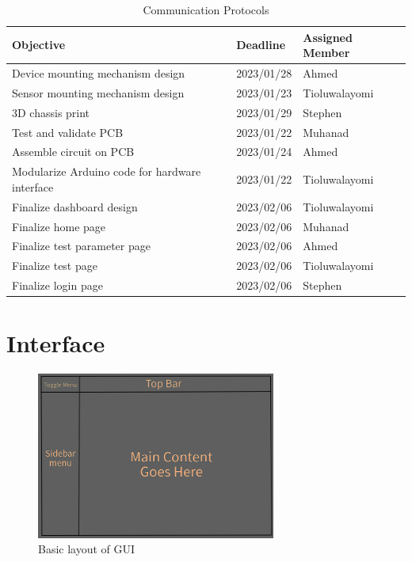 \documentclass[12pt, titlepage]{article}
\begin{document}
\begin{table}[!h]
  \begin{tabular}{| p{} | p{}| p{}|}
    \hline
    \rowcolor[gray]{0.9}
    Objective & Deadline & Assigned Member\\
    \hline
    Device mounting mechanism design & 2023/01/28 & Ahmed\\
    \hline
    Sensor mounting mechanism design &  2023/01/23 & Tioluwalayomi\\
    \hline
    3D chassis print & 2023/01/29 & Stephen \\
    \hline
    Test and validate PCB & 2023/01/22 & Muhanad \\
    \hline
    Assemble circuit on PCB & 2023/01/24 & Ahmed \\
    \hline
    Modularize Arduino code for hardware interface & 2023/01/22 & Tioluwalayomi \\
    \hline
    Finalize dashboard design & 2023/02/06 & Tioluwalayomi \\
    \hline
    Finalize home page & 2023/02/06 & Muhanad \\
    \hline
    Finalize test parameter page & 2023/02/06 & Ahmed\\
    \hline
    Finalize test page & 2023/02/06 & Tioluwalayomi\\
    \hline
    Finalize login page & 2023/02/06 & Stephen\\
    \hline
   
  \end{tabular}
  \caption{Communication Protocols}
\end{table}


% 

\newpage{}

\appendix

\section{Interface}
\begin{figure}[h!]
  \begin{center}
  \includegraphics[width=0.7\textwidth]{GUI_sketch}
  \caption{Basic layout of GUI}
  \label{Fig_SystemContext} 
  \end{center}
  \end{figure}
\end{document}
